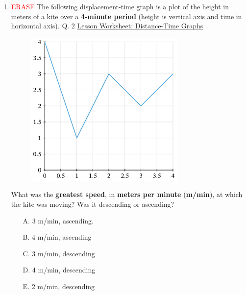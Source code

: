 \documentclass[A4,12pt]{article}
\begin{document}
\begin{enumerate}[label=\bfseries (\arabic*)]
\item \textcolor{red}{ERASE} The following displacement-time graph is a plot of the height in meters of a kite over a \textbf{4-minute period} (height is vertical axis and time in horizontal axis).  \cite{Nagwa} Q. 2 \href{https://www.nagwa.com/en/worksheets/932192593730/}{Lesson Worksheet: Distance-Time Graphs}
%
\begin{figure}[H]
    \centering
    \includegraphics[scale=0.7]{Nagwa_Q2_kin2.png}
\end{figure}
%
What was the \textbf{greatest speed}, in \textbf{meters per minute} (\textbf{m/min}), at which the kite was moving? Was it descending or ascending?
%
\begin{itemize}
    \item[A. ] 3 m/min, ascending.
    \item[B. ] 4 m/min, ascending
    \item[C. ] 3 m/min, descending
    \item[D. ] 4 m/min, descending
    \item[E. ] 2 m/min, descending
\end{itemize}
%

\end{enumerate}
\end{document}
